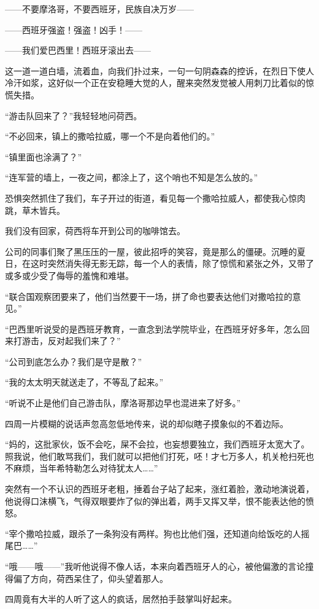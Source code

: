 \par ——不要摩洛哥，不要西班牙，民族自决万岁——
\par ——西班牙强盗！强盗！凶手！——
\par ——我们爱巴西里！西班牙滚出去——
\par 这一道一道白墙，流着血，向我们扑过来，一句一句阴森森的控诉，在烈日下使人冷汗如浆，这好似一个正在安稳睡大觉的人，醒来突然发觉被人用刺刀比着似的惊慌失措。
\par “游击队回来了？”我轻轻地问荷西。
\par “不必回来，镇上的撒哈拉威，哪一个不是向着他们的。”
\par “镇里面也涂满了？”
\par “连军营的墙上，一夜之间，都涂上了，这个哨也不知是怎么放的。”
\par 恐惧突然抓住了我们，车子开过的街道，看见每一个撒哈拉威人，都使我心惊肉跳，草木皆兵。
\par 我们没有回家，荷西将车开到公司的咖啡馆去。
\par 公司的同事们聚了黑压压的一屋，彼此招呼的笑容，竟是那么的僵硬。沉睡的夏日，在这时突然消失得无影无踪，每一个人的表情，除了惊慌和紧张之外，又带了或多或少受了侮辱的羞愧和难堪。
\par “联合国观察团要来了，他们当然要干一场，拼了命也要表达他们对撒哈拉的意见。”
\par “巴西里听说受的是西班牙教育，一直念到法学院毕业，在西班牙好多年，怎么回来打游击，反对起我们来了？”
\par “公司到底怎么办？我们是守是散？”
\par “我的太太明天就送走了，不等乱了起来。”
\par “听说不止是他们自己游击队，摩洛哥那边早也混进来了好多。”
\par 四周一片模糊的说话声忽高忽低地传来，说的却似瞎子摸象似的不着边际。
\par “妈的，这批家伙，饭不会吃，屎不会拉，也妄想要独立，我们西班牙太宽大了。照我说，他们敢骂我们，我们就可以把他们打死，呸！才七万多人，机关枪扫死也不麻烦，当年希特勒怎么对待犹太人……”
\par 突然有一个不认识的西班牙老粗，捶着台子站了起来，涨红着脸，激动地演说着，他说得口沫横飞，气得双眼要炸了似的弹出着，两手又挥又举，恨不能表达他的愤怒。
\par “宰个撒哈拉威，跟杀了一条狗没有两样。狗也比他们强，还知道向给饭吃的人摇尾巴……”
\par “哦——哦——”我听他说得不像人话，本来向着西班牙人的心，被他偏激的言论撞得偏了方向，荷西呆住了，仰头望着那人。
\par 四周竟有大半的人听了这人的疯话，居然拍手鼓掌叫好起来。
